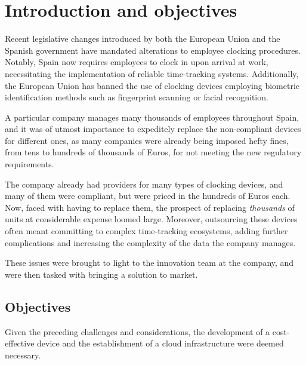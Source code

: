 \chapter{Introduction and objectives}
\label{cap:introduction}


Recent legislative changes introduced by both the European Union and the Spanish government have mandated 
alterations to employee clocking procedures. Notably, Spain now requires employees to clock in upon arrival 
at work, necessitating the implementation of reliable time-tracking systems. Additionally, the European Union 
has banned the use of clocking devices employing biometric identification methods such as fingerprint 
scanning or facial recognition.

A particular company manages many thousands of employees throughout Spain, and it was of utmost importance
to expeditely replace the non-compliant devices for different ones, as many companies were already being
imposed hefty fines, from tens to hundreds of thousands of Euros, for not meeting the new regulatory 
requirements.

The company already had providers for many types of clocking devices, and many of them were compliant, but 
were priced in the hundreds of Euros each. Now, faced with having to replace them, the prospect of replacing 
\textit{thousands} of units at considerable expense loomed large.  Moreover, outsourcing these devices often 
meant committing to complex time-tracking ecosystems, adding further complications and increasing the
complexity of the data the company manages.

These issues were brought to light to the innovation team at the company, and were then tasked with bringing 
a solution to market.

\section{Objectives}

Given the preceding challenges and considerations, the development of a cost-effective device and the establishment 
of a cloud infrastructure were deemed necessary.

